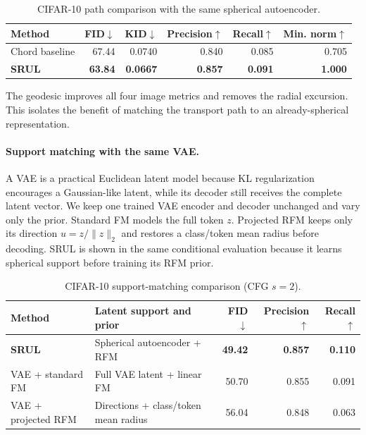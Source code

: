 \documentclass{article}
\begin{document}
\begin{table}[H]
\centering
\small
\caption{CIFAR-10 path comparison with the same spherical autoencoder.}
\label{tab:geometry}
\setlength{\tabcolsep}{8pt}
\begin{tabular}{lrrrrr}
\toprule
Method & FID$\downarrow$ & KID$\downarrow$ & Precision$\uparrow$ & Recall$\uparrow$ & Min. norm$\uparrow$ \\
\midrule
Chord baseline & 67.44 & 0.0740 & 0.840 & 0.085 & 0.705 \\
\textbf{SRUL} & \textbf{63.84} & \textbf{0.0667} & \textbf{0.857} & \textbf{0.091} & \textbf{1.000} \\
\bottomrule
\end{tabular}
\end{table}
The geodesic improves all four image metrics and removes the radial excursion. This isolates the benefit of matching the transport path to an already-spherical representation.

\paragraph{Support matching with the same VAE.}
A VAE is a practical Euclidean latent model because KL regularization encourages a Gaussian-like latent, while its decoder still receives the complete latent vector. We keep one trained VAE encoder and decoder unchanged and vary only the prior. Standard FM models the full token $z$. Projected RFM keeps only its direction $u=z/\|z\|_2$ and restores a class/token mean radius before decoding. SRUL is shown in the same conditional evaluation because it learns spherical support before training its RFM prior.

\begin{table}[H]
\centering
\small
\caption{CIFAR-10 support-matching comparison (CFG $s=2$).}
\label{tab:support}
\setlength{\tabcolsep}{6pt}
\begin{tabular}{p{2.75cm}p{4.2cm}rrr}
\toprule
Method & Latent support and prior & FID$\downarrow$ & Precision$\uparrow$ & Recall$\uparrow$ \\
\midrule
\textbf{SRUL} & Spherical autoencoder + RFM & \textbf{49.42} & \textbf{0.857} & \textbf{0.110} \\
VAE + standard FM & Full VAE latent + linear FM & 50.70 & 0.855 & 0.091 \\
VAE + projected RFM & Directions + class/token mean radius & 56.04 & 0.848 & 0.063 \\
\bottomrule
\end{tabular}
\end{table}
\end{document}
